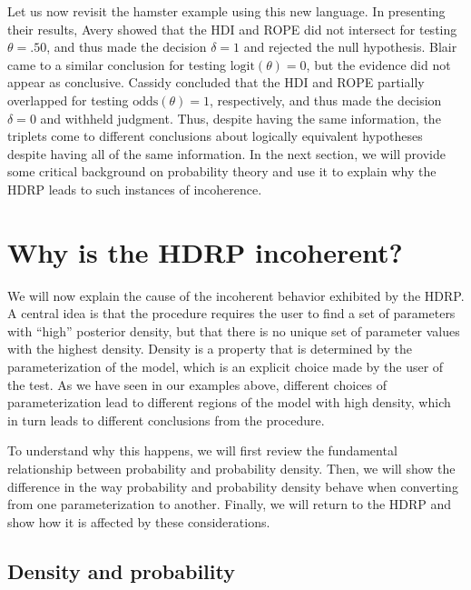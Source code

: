 \documentclass[man]{apa}
\newcommand{\hdr}{HDRP}
\newcommand{\oddss}{\text{odds}}
\newcommand{\logit}{\text{logit}}
\begin{document}
Let us now revisit the hamster example using this new language. In presenting their results, Avery showed that the HDI and ROPE did not intersect for testing $\theta=.50$, and thus made the decision $\delta=1$ and rejected the null hypothesis. Blair came to a similar conclusion for testing $\logit(\theta)=0$, but the evidence did not appear as conclusive. Cassidy concluded that the HDI and ROPE partially overlapped for testing $\oddss(\theta)=1$, respectively, and thus made the decision $\delta=0$ and withheld judgment. Thus, despite having the same information, the triplets come to different conclusions about logically equivalent hypotheses despite having all of the same information. In the next section, we will provide some critical background on probability theory and use it to explain why the \hdr{} leads to such instances of incoherence. 

\section*{Why is the \hdr{} incoherent?}

We will now explain the cause of the incoherent behavior exhibited by the \hdr{}. A central idea is that the procedure requires the user to find a set of parameters with ``high'' posterior density, but that there is no unique set of parameter values with the highest density. Density is a property that is determined by the parameterization of the model, which is an explicit choice made by the user of the test. As we have seen in our examples above, different choices of parameterization lead to different regions of the model with high density, which in turn leads to different conclusions from the procedure.

To understand why this happens, we will first review the fundamental relationship between probability and probability density. Then, we will show the difference in the way probability and probability density behave when converting from one parameterization to another. Finally, we will return to the \hdr{} and show how it is affected by these considerations.  
    
   \subsection*{Density and probability}
\end{document}
